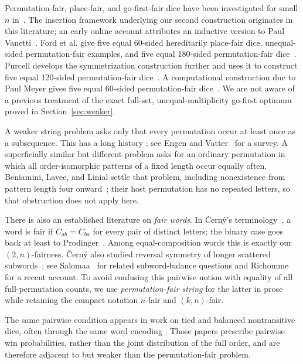 \documentclass[11pt]{article}
\theoremstyle{definition}
\theoremstyle{remark}
\begin{document}
Permutation-fair, place-fair, and go-first-fair dice have been investigated
for small \(n\) in~\cite{harshbarger-web,harshbarger2012,ford2023,purcell}.
The insertion framework underlying our second construction originates in
this literature; an early online account attributes an inductive version to
Paul Vanetti~\cite{knoll2012}.  Ford et al. give five equal 60-sided
hereditarily place-fair dice, unequal-sided permutation-fair examples, and
five equal 180-sided permutation-fair dice~\cite{ford2023}.  Purcell develops
the symmetrization construction further and uses it to construct five equal
120-sided permutation-fair dice~\cite{purcell}.  A computational construction
due to Paul Meyer gives five equal 60-sided permutation-fair
dice~\cite{meyer60}.  We are not aware of a
previous treatment of the exact full-set, unequal-multiplicity go-first
optimum proved in Section~\ref{sec:weaker}.

A weaker string problem asks only that every permutation occur at least once
as a subsequence.  This has a long history
\cite{chvatal1972,newey1973,adleman1974,koutas1975,galbiati1976,kleitman1976,
zalinescu2011,radomirovic2012}; see Engen and Vatter~\cite{engen2020} for a
survey.  A superficially similar but different problem asks for an ordinary
permutation in which all order-isomorphic patterns of a fixed length occur
equally often.  Beniamini, Lavee, and Linial settle that problem, including
nonexistence from pattern length four onward~\cite{beniamini2025}; their host
permutation has no repeated letters, so that obstruction does not apply here.

There is also an established literature on \emph{fair words}.  In \v{C}ern\'y's
terminology~\cite{cerny2007,cerny2009}, a word is fair if
\(C_{ab}=C_{ba}\) for every pair of distinct letters; the binary case goes
back at least to Prodinger~\cite{prodinger1979}.  Among equal-composition
words this is exactly our \((2,n)\)-fairness.  \v{C}ern\'y also studied
reversal symmetry of longer scattered subwords~\cite{cerny2008}; see
Salomaa~\cite{salomaa2007} for related subword-balance questions and
Richomme~\cite{richomme2026} for a recent account.  To avoid confusing this
pairwise notion with equality of all full-permutation counts, we use
\emph{permutation-fair string} for the latter in prose while retaining the
compact notation \(n\)-fair and \((k,n)\)-fair.

The same pairwise condition appears in work on tied and balanced
nontransitive dice, often through the same word encoding
\cite{kronenthal-traldi2009,cooley-et-al2014,schaefer-schweig2017,
hur-kim2021,kim-et-al2024}.  Those papers prescribe pairwise win
probabilities, rather than the joint distribution of the full order, and are
therefore adjacent to but weaker than the permutation-fair problem.
\end{document}
